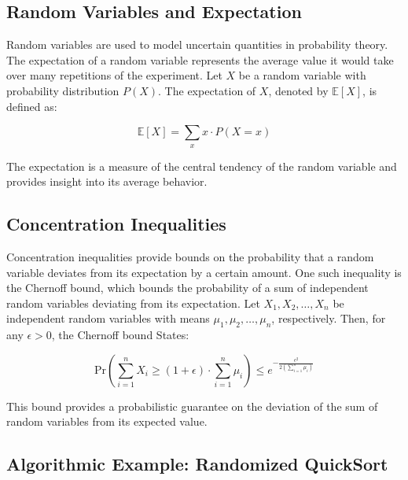 \documentclass[12pt]{book} %
\begin{document}
\subsection{Random Variables and Expectation}

Random variables are used to model uncertain quantities in probability theory. The expectation of a random variable represents the average value it would take over many repetitions of the experiment. Let \(X\) be a random variable with probability distribution \(P(X)\). The expectation of \(X\), denoted by \(\mathbb{E}[X]\), is defined as:

\[\mathbb{E}[X] = \sum_{x} x \cdot P(X = x)\]

The expectation is a measure of the central tendency of the random variable and provides insight into its average behavior.

\subsection{Concentration Inequalities}

Concentration inequalities provide bounds on the probability that a random variable deviates from its expectation by a certain amount. One such inequality is the Chernoff bound, which bounds the probability of a sum of independent random variables deviating from its expectation. Let \(X_1, X_2, \ldots, X_n\) be independent random variables with means \(\mu_1, \mu_2, \ldots, \mu_n\), respectively. Then, for any \(\epsilon > 0\), the Chernoff bound States:

\[\text{Pr}\left(\sum_{i=1}^n X_i \geq (1 + \epsilon) \cdot \sum_{i=1}^n \mu_i\right) \leq e^{-\frac{\epsilon^2}{2(\sum_{i=1}^n \mu_i)}}\]

This bound provides a probabilistic guarantee on the deviation of the sum of random variables from its expected value.

\FloatBarrier
\subsection{Algorithmic Example: Randomized QuickSort}
\end{document}
